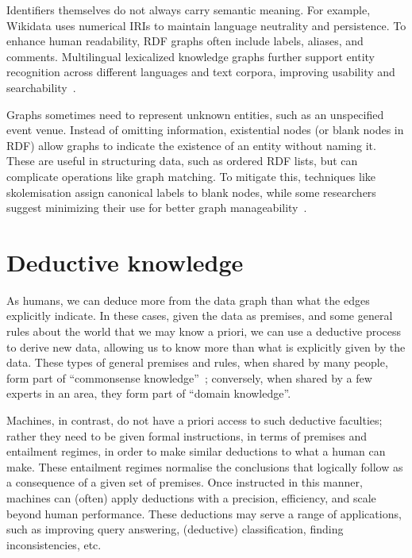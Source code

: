 Identifiers themselves do not always carry semantic meaning. For example, Wikidata uses numerical IRIs to maintain language neutrality and persistence. To enhance human readability, RDF graphs often include labels, aliases, and comments. Multilingual lexicalized knowledge graphs further support entity recognition across different languages and text corpora, improving usability and searchability~\cite{DeMelo2015Lexvo.org}\cite{MartinezRodriguez2020InformationExtractionMeetsSemanticWeb}.

Graphs sometimes need to represent unknown entities, such as an unspecified event venue. Instead of omitting information, existential nodes (or blank nodes in RDF) allow graphs to indicate the existence of an entity without naming it. These are useful in structuring data, such as ordered RDF lists, but can complicate operations like graph matching. To mitigate this, techniques like skolemisation assign canonical labels to blank nodes, while some researchers suggest minimizing their use for better graph manageability~\cite{Cyganiak2014rdf}\cite{Hogan2017CanonicalFormsIsomorphicEquivalentRDFGraphs}\cite{Longley2019RDFDatasetNormalization}.

\section{Deductive knowledge}\label{deductive-knowledge}
As humans, we can deduce more from the data graph than what the edges explicitly indicate. In these cases, given the data as premises, and some general rules about the world that we may know a priori, we can use a deductive process to derive new data, allowing us to know more than what is explicitly given by the data. These types of general premises and rules, when shared by many people, form part of ``commonsense knowledge''~\cite{McCarthy1990FomalizingCommonsense}; conversely, when shared by a few experts in an area, they form part of ``domain knowledge''. 

Machines, in contrast, do not have a priori access to such deductive faculties; rather they need to be given formal instructions, in terms of premises and entailment regimes, in order to make similar deductions to what a human can make. These entailment regimes normalise the conclusions that logically follow as a consequence of a given set of premises. Once instructed in this manner, machines can (often) apply deductions with a precision, efficiency, and scale beyond human performance. These deductions may serve a range of applications, such as improving query answering, (deductive) classification, finding inconsistencies, etc. 


